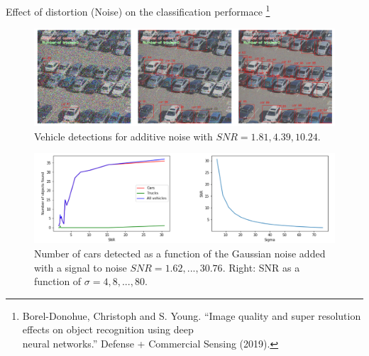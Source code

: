 \documentclass{libs/ufc_format}
\begin{document}
\begin{frame}{\small Effect of distortion (Noise) on the classification performace \footnote[frame]{\tiny Borel-Donohue, Christoph and S. Young. “Image quality and super resolution effects on object recognition using deep \\ neural networks.” Defense + Commercial Sensing (2019).}}
    \begin{figure}
        \centering
        \includegraphics[scale=0.15]{libs/noiseeffect.png}
        \caption{Vehicle detections for additive noise with $SNR = {1.81, 4.39, 10.24}$.}
        \label{fig:challengenoise}
    \end{figure}
    
    \begin{figure}
        \centering
        \includegraphics[scale=0.15]{libs/noiseeffect2.png}
        \caption{Number of cars detected as a function of the Gaussian noise added with a signal to noise $SNR = {1.62,..., 30.76}$. Right: SNR as a function of $\sigma = {4, 8,..., 80}$.}
        \label{fig:challengenoise2}
    \end{figure}

\end{frame}
\end{document}
